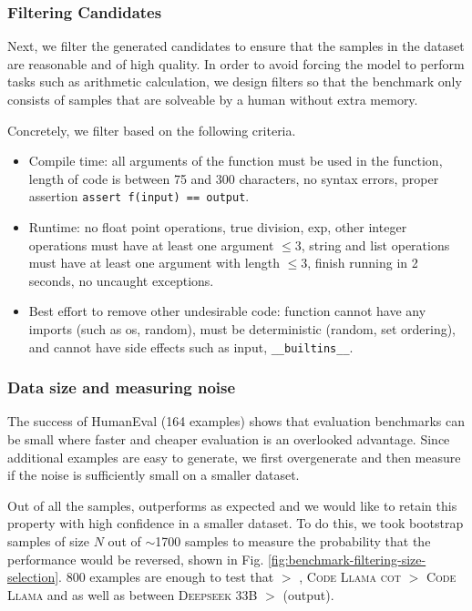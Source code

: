 \subsubsection{Filtering Candidates} \label{subsec:filtering-candidates}
Next, we filter the generated candidates to ensure that the samples in the dataset are reasonable and of high quality. In order to avoid forcing the model to perform tasks such as arithmetic calculation, we design filters so that the benchmark only consists of samples that are solveable by a human without extra memory.

Concretely, we filter based on the following criteria. 
\begin{itemize}
    \item Compile time: all arguments of the function must be used in the function, length of code is between 75 and 300 characters, no syntax errors, proper assertion \texttt{assert f(input) == output}.

    \item Runtime: no float point operations, true division, exp, other integer operations must have at least one argument $\leq 3$, string and list operations must have at least one argument with length $\leq 3$, finish running in 2 seconds, no uncaught exceptions.

    \item Best effort to remove other undesirable code: function cannot have any imports (such as os, random), must be deterministic (random, set ordering), and cannot have side effects such as input, \texttt{\_\_builtins\_\_}.
\end{itemize}

\subsubsection{Data size and measuring noise} \label{subsec:data-size-noise}
The success of HumanEval (164 examples) shows that evaluation benchmarks can be small where faster and cheaper evaluation is an overlooked advantage. Since additional examples are easy to generate, we first overgenerate and then measure if the noise is sufficiently small on a smaller dataset. 


Out of all the samples, \codellamalarge outperforms \codellamamed as expected and we would like to retain this property with high confidence in a smaller dataset. To do this, we took bootstrap samples of size $N$ out of $\sim$1700 samples to measure the probability that the performance would be reversed, shown in Fig. \ref{fig:benchmark-filtering-size-selection}. 800 examples are enough to test that \codellamalarge $>$ \codellamamed, \textsc{Code Llama cot} $>$ \textsc{Code Llama} and  as well as between \textsc{Deepseek 33B} $>$ \codellamalarge (output).


